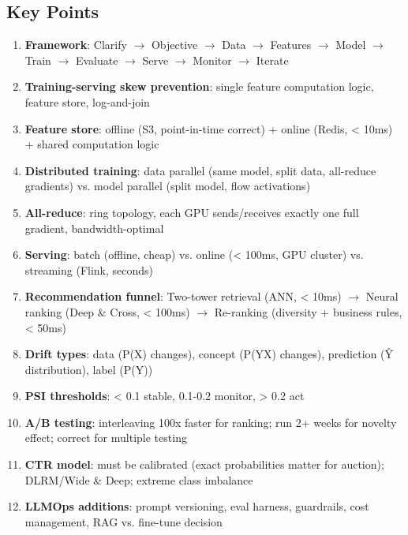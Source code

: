 \documentclass[11pt]{article}
\providecommand{\tightlist}{\setlength{\itemsep}{1pt}\setlength{\parskip}{0pt}}
\begin{document}
\subsection{Key Points}\label{key-points}

\begin{enumerate}
\def\labelenumi{\arabic{enumi}.}
\tightlist
\item
  \textbf{Framework}: Clarify \(\rightarrow\) Objective \(\rightarrow\) Data \(\rightarrow\) Features \(\rightarrow\) Model \(\rightarrow\) Train \(\rightarrow\) Evaluate \(\rightarrow\) Serve \(\rightarrow\) Monitor \(\rightarrow\) Iterate
\item
  \textbf{Training-serving skew prevention}: single feature computation logic, feature store, log-and-join
\item
  \textbf{Feature store}: offline (S3, point-in-time correct) + online (Redis, \textless{} 10ms) + shared computation logic
\item
  \textbf{Distributed training}: data parallel (same model, split data, all-reduce gradients) vs. model parallel (split model, flow activations)
\item
  \textbf{All-reduce}: ring topology, each GPU sends/receives exactly one full gradient, bandwidth-optimal
\item
  \textbf{Serving}: batch (offline, cheap) vs. online (\textless{} 100ms, GPU cluster) vs. streaming (Flink, seconds)
\item
  \textbf{Recommendation funnel}: Two-tower retrieval (ANN, \textless{} 10ms) \(\rightarrow\) Neural ranking (Deep \& Cross, \textless{} 100ms) \(\rightarrow\) Re-ranking (diversity + business rules, \textless{} 50ms)
\item
  \textbf{Drift types}: data (P(X) changes), concept (P(Y\textbar X) changes), prediction (Ŷ distribution), label (P(Y))
\item
  \textbf{PSI thresholds}: \textless{} 0.1 stable, 0.1-0.2 monitor, \textgreater{} 0.2 act
\item
  \textbf{A/B testing}: interleaving 100x faster for ranking; run 2+ weeks for novelty effect; correct for multiple testing
\item
  \textbf{CTR model}: must be calibrated (exact probabilities matter for auction); DLRM/Wide \& Deep; extreme class imbalance
\item
  \textbf{LLMOps additions}: prompt versioning, eval harness, guardrails, cost management, RAG vs. fine-tune decision
\end{enumerate}
\end{document}
